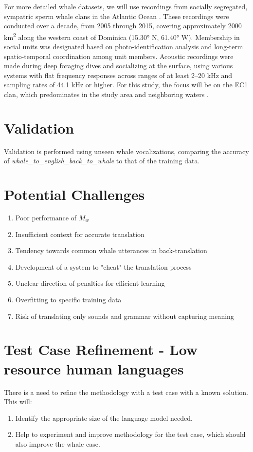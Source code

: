 \documentclass{article}
\begin{document}
For more detailed whale datasets, we will use recordings from socially segregated, sympatric sperm whale clans in the Atlantic Ocean \cite{rsos}. These recordings were conducted over a decade, from 2005 through 2015, covering approximately 2000 km\textsuperscript{2} along the western coast of Dominica (15.30° N, 61.40° W). Membership in social units was designated based on photo-identification analysis and long-term spatio-temporal coordination among unit members. Acoustic recordings were made during deep foraging dives and socializing at the surface, using various systems with flat frequency responses across ranges of at least 2–20 kHz and sampling rates of 44.1 kHz or higher. For this study, the focus will be on the EC1 clan, which predominates in the study area and neighboring waters \cite{rsos}.

\section{Validation}
Validation is performed using unseen whale vocalizations, comparing the accuracy of \textit{whale\_to\_english\_back\_to\_whale} to that of the training data.

\section{Potential Challenges}
\begin{enumerate}
    \item Poor performance of $M_w$
    \item Insufficient context for accurate translation
    \item Tendency towards common whale utterances in back-translation
    \item Development of a system to "cheat" the translation process
    \item Unclear direction of penalties for efficient learning
    \item Overfitting to specific training data
    \item Risk of translating only sounds and grammar without capturing meaning
\end{enumerate}
\section{Test Case Refinement - Low resource human languages}
There is a need to refine the methodology with a test case with a known solution. This will:
\begin{enumerate}
    \item Identify the appropriate size of the language model needed.
    \item Help to experiment and improve methodology for the test case, which should also improve the whale case.
\end{enumerate}
\end{document}
